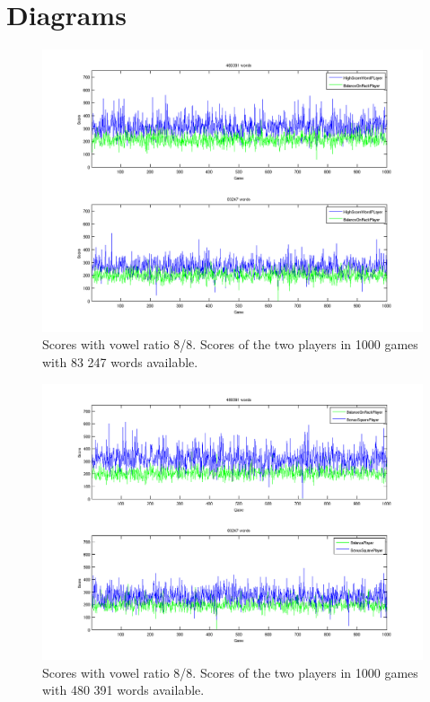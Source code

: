 \documentclass[a4paper, 12pt]{report}
\begin{document}
\chapter{Diagrams}
\graphicspath{{../results/Plots/}}

\begin{figure}[h]
\centering
\includegraphics[scale=0.5]{HighBalance8vow_bothDict}
\caption {Scores with vowel ratio 8/8. Scores of the two players in 1000 games with 83 247 words available.}
\label{fig:largeDict}
\end{figure}

\begin{figure}[h]
\centering
\includegraphics[scale=0.5]{BonusBalance8vow_bothDict}
\caption {Scores with vowel ratio 8/8. Scores of the two players in 1000 games with 480 391 words available.}
\label{fig:bonusBalanceLargeDict}
\end{figure}
\end{document}
